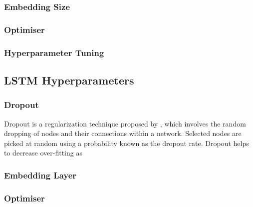 \subsubsection{Embedding Size}
\subsubsection{Optimiser}
\subsubsection{Hyperparameter Tuning}
\subsection{LSTM Hyperparameters}
\subsubsection{Dropout}
Dropout is a regularization technique proposed by \cite{Srivastava2014}, which involves the random dropping of nodes and their connections within a network. Selected nodes are picked at random using a probability known as the dropout rate. Dropout helps to decrease over-fitting as 
\subsubsection{Embedding Layer}
\subsubsection{Optimiser}

